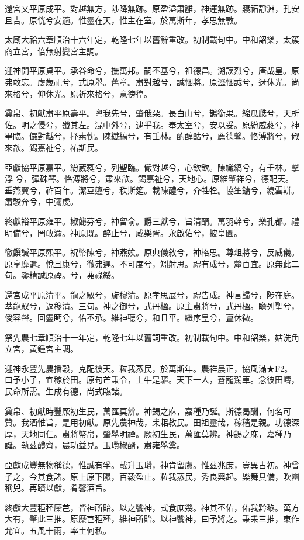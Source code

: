 \begin{pinyinscope}
還宮乂平原成平。對越無方，陟降無跡。原盈溢肅雝，神運無跡。寢祏靜淵，孔安且吉。原恍兮安適。惟靈在天，惟主在室。於萬斯年，孝思無斁。

太廟大祫六章順治十六年定，乾隆七年以舊辭重改。初制載句中。中和韶樂，太簇商立宮，倍無射變宮主調。

迎神開平原貞平。承眷命兮，撫萬邦。嗣丕基兮，祖德昌。溯謨烈兮，唐哉皇。原弗敢忘。虔歲祀兮，式原舉。舊章。肅對越兮，誠悃將。原瀝悃誠兮，迓休光。尚來格兮，仰休光。原祈來格兮，意徬徨。

奠帛、初獻肅平原壽平。粵我先兮，肇俄朵。長白山兮，鵲銜果。綿瓜瓞兮，天所佐。明之侵兮，殲其左。混中外兮，逮乎我。奉太室兮，安以妥。原紛威蕤兮，神畢臨。儼對越兮，抒素忱。陳纖縞兮，有壬林。酌醇酤兮，薦德馨。恪溥將兮，俶來歆。錫嘉祉兮，祐斯民。

亞獻協平原嘉平。紛葳蕤兮，列聖臨。儼對越兮，心欽欽。陳纖縞兮，有壬林。擊浮兮，彈硃琴。恪溥將兮，肅來歆。錫嘉祉兮，天地心。原維肇祥兮，德配天。垂燕翼兮，祚百年。潔豆籩兮，秩斯筵。載陳醴兮，介牲牷。協笙鏞兮，繞雲軿。肅駿奔兮，中彌虔。

終獻裕平原雍平。椒飶芬兮，神留俞。爵三獻兮，旨清醑。萬羽幹兮，樂孔都。禮明備兮，罔敢渝。神原既。醉止兮，咸樂胥。永啟佑兮，披皇圖。

徹饌諴平原熙平。祝幣陳兮，神燕娭。原典儀敘兮，神格思。尊俎將兮，反威儀。原享靡遺。悅且康兮，徹弗遲。不可度兮，矧射思。禮有成兮，釐百宜。原無此二句。鑒精誠原禋。兮，茀祿綏。

還宮成平原清平。龍之馭兮，旋穆清。原孝思展兮，禮告成。神言歸兮，陟在庭。萃龍馭兮，返穆清。三句。神之御兮，式丹楹。原主肅將兮，式丹楹。瞻列聖兮，僾容聲。回靈眄兮，佑丕承。維神聽兮，和且平。繼序皇兮，亶休徵。

祭先農七章順治十一年定，乾隆七年以舊詞重改。初制載句中。中和韶樂，姑洗角立宮，黃鍾宮主調。

迎神永豐先農播穀，克配彼天。粒我蒸民，於萬斯年。農祥晨正，協風滿★F2。曰予小子，宜稼於田。原句芒秉令，土牛是驅。天下一人，蒼龍駕車。念彼田疇，民命所需。生成有德，尚式臨諸。

奠帛、初獻時豐厥初生民，萬匯莫辨。神錫之庥，嘉種乃誕。斯德曷酬，何名可贊。我酒惟旨，是用初獻。原先農神哉，耒耜教民。田祖靈哉，稼穡是親。功德深厚，天地同仁。肅將幣帛，肇舉明禋。厥初生民，萬匯莫辨。神錫之庥，嘉種乃誕。執茲醴齊，農功益見。玉瓚椒醑，肅雍舉奠。

亞獻成豐無物稱德，惟誠有孚。載升玉瓚，神肯留虞。惟茲兆庶，豈異古初。神曾子之，今其食諸。原上原下隰，百穀盈止。粒我蒸民，秀良興起。樂舞具備，吹豳稱兕。再躋以獻，肴馨酒旨。

終獻大豐秬秠穈芑，皆神所貽。以之饗神，式食庶幾。神其丕佑，佑我黔黎。萬方大有，肇此三推。原穈芑秬秠，維神所貽。以神饗神，曰予將之。秉耒三推，東作允宜。五風十雨，率土何私。


\end{pinyinscope}
